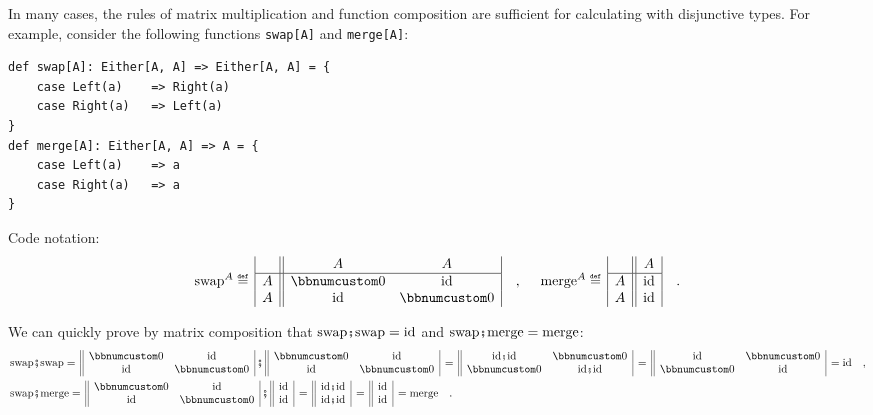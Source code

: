 In many cases, the rules of matrix multiplication and function composition
are sufficient for calculating with disjunctive types. For example,
consider the following functions \lstinline!swap[A]! and \lstinline!merge[A]!:
\begin{lstlisting}
def swap[A]: Either[A, A] => Either[A, A] = {
    case Left(a)    => Right(a)
    case Right(a)   => Left(a)
}
def merge[A]: Either[A, A] => A = {
    case Left(a)    => a
    case Right(a)   => a
}
\end{lstlisting}
Code notation:
\[
\text{swap}^{A}\triangleq\,\begin{array}{|c||cc|}
 & A & A\\
\hline A & \bbnum 0 & \text{id}\\
A & \text{id} & \bbnum 0
\end{array}\quad,~\quad\text{merge}^{A}\triangleq\,\begin{array}{|c||c|}
 & A\\
\hline A & \text{id}\\
A & \text{id}
\end{array}\quad.
\]

We can quickly prove by matrix composition that $\text{swap}\bef\text{swap}=\text{id}$
and $\text{swap}\bef\text{merge}=\text{merge}$:
\begin{align*}
 & \text{swap}\bef\text{swap}=\,\begin{array}{||cc|}
\bbnum 0 & \text{id}\\
\text{id} & \bbnum 0
\end{array}\,\bef\,\begin{array}{||cc|}
\bbnum 0 & \text{id}\\
\text{id} & \bbnum 0
\end{array}\,=\,\begin{array}{||cc|}
\text{id}\bef\text{id} & \bbnum 0\\
\bbnum 0 & \text{id}\bef\text{id}
\end{array}\,=\,\begin{array}{||cc|}
\text{id} & \bbnum 0\\
\bbnum 0 & \text{id}
\end{array}\,=\text{id}\quad,\\
 & \text{swap}\bef\text{merge}=\,\begin{array}{||cc|}
\bbnum 0 & \text{id}\\
\text{id} & \bbnum 0
\end{array}\,\bef\,\begin{array}{||c|}
\text{id}\\
\text{id}
\end{array}\,=\,\begin{array}{||c|}
\text{id}\bef\text{id}\\
\text{id}\bef\text{id}
\end{array}\,=\,\begin{array}{||c|}
\text{id}\\
\text{id}
\end{array}\,=\text{merge}\quad.
\end{align*}


